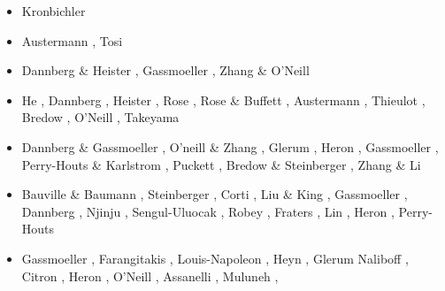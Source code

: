 \begin{itemize}
\begin{scriptsize}
\begin{itemize}
\item[\twothousandtwelve] Kronbichler \etal \cite{krhb12}
\item[\twothousandfifteen] Austermann \etal \cite{aupm15}, Tosi \etal \cite{tosn15}
\item[\twothousandsixteen] Dannberg \& Heister \cite{dahe16}, Gassmoeller \etal \cite{gadb16}, 
                           Zhang \& O'Neill \cite{zhon16}
\item[\twothousandseventeen] He \etal \cite{hepb17}, Dannberg \etal \cite{daef17}, 
                             Heister \etal \cite{hedg17}, Rose \etal \cite{robh17}, 
                             Rose \& Buffett \cite{robu17}, Austermann \etal \cite{aumh17},
                             Thieulot \cite{thie17}, Bredow \etal \cite{brsg17}, 
                             O'Neill \etal \cite{onmz17}, Takeyama \etal \cite{tasm17}
\item[\twothousandeighteen] Dannberg \& Gassmoeller \cite{daga18}, O'neill \& Zhang \cite{onzh18}, 
                            Glerum \etal \cite{gltf18}, Heron \etal \cite{heps18}, 
                            Gassmoeller \etal \cite{galh18}, 
                            Perry-Houts \& Karlstrom \cite{peka18}, Puckett \etal \cite{puth18},
                            Bredow \& Steinberger \cite{brst18b}, Zhang \& Li \cite{zhli18}
\item[\twothousandnineteen] Bauville \& Baumann \cite{baba19}, Steinberger \etal \cite{stbl19}, 
                            Corti \etal \cite{cocf19}, Liu \& King \cite{liki19}, 
                            Gassmoeller \etal \cite{galb19}, Dannberg \etal \cite{dagg19},
                            Njinju \etal \cite{njas19}, Sengul-Uluocak \etal \cite{sepg19}, 
                            Robey \etal \cite{ropu19}, Fraters \etal \cite{frtv19,frbt19},
                            Lin \etal \cite{lixs19}, Heron \etal \cite{hepm19},
                            Perry-Houts \cite{perr19}
\item[\twothousandtwenty] Gassmoeller \etal \cite{gadb20}, Farangitakis \etal \cite{fahm20}, 
                          Louis-Napoleon \etal \cite{logb20}, Heyn \etal \cite{hect20,hect20b}, 
                          Glerum \etal \cite{glbs20}
                          Naliboff \etal \cite{nagb20}, Citron \etal \cite{cilw20},
                          Heron \etal \cite{hemn20}, O'Neill \etal \cite{onlw20}, 
                          Assanelli \etal \cite{aslr20}, Muluneh \etal \cite{mubi20},

\end{itemize}
\end{scriptsize}
\end{itemize}
